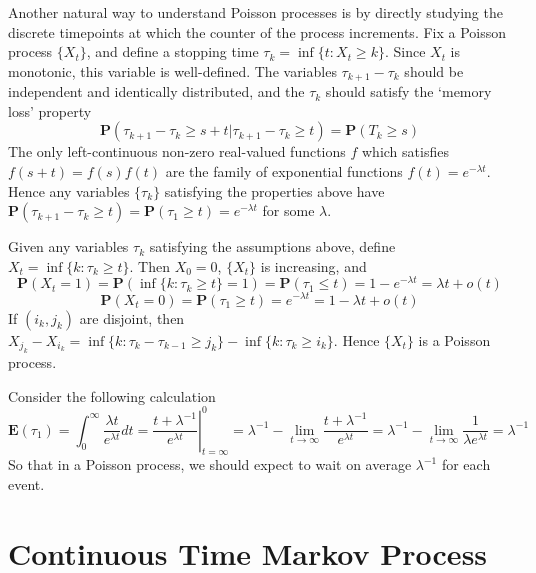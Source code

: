 Another natural way to understand Poisson processes is by directly studying the discrete timepoints at which the counter of the process increments. Fix a Poisson process $\{ X_t \}$, and define a stopping time $\tau_k = \inf \{ t: X_t \geq k \}$. Since $X_t$ is monotonic, this variable is well-defined. The variables $\tau_{k+1} - \tau_k$ should be independent and identically distributed, and the $\tau_k$ should satisfy the `memory loss' property
%
\[ \mathbf{P}(\tau_{k+1} - \tau_k \geq s + t | \tau_{k+1} - \tau_k \geq t) = \mathbf{P}(T_k \geq s) \]
%
The only left-continuous non-zero real-valued functions $f$ which satisfies $f(s + t) = f(s) f(t)$ are the family of exponential functions $f(t) = e^{-\lambda t}$. Hence any variables $\{ \tau_k \}$ satisfying the properties above have $\mathbf{P}(\tau_{k+1} - \tau_k \geq t) = \mathbf{P}(\tau_1 \geq t) = e^{-\lambda t}$ for some $\lambda$.

Given any variables $\tau_k$ satisfying the assumptions above, define $X_t = \inf \{ k: \tau_k \geq t \}$. Then $X_0 = 0$, $\{ X_t \}$ is increasing, and
%
\[ \mathbf{P}(X_t = 1) = \mathbf{P}(\inf \{ k : \tau_k \geq t \} = 1) = \mathbf{P}(\tau_1 \leq t) = 1 - e^{-\lambda t} = \lambda t + o(t) \]
%
\[ \mathbf{P}(X_t = 0) = \mathbf{P}(\tau_1 \geq t) = e^{-\lambda t} = 1 - \lambda t + o(t) \]
%
If $(i_k, j_k)$ are disjoint, then $X_{j_k} - X_{i_k} = \inf \{ k : \tau_k - \tau_{k-1} \geq j_k \} - \inf \{ k : \tau_k \geq i_k \}$. Hence $\{ X_t \}$ is a Poisson process.

Consider the following calculation
%
\[ \mathbf{E}(\tau_1) = \int_0^\infty \frac{\lambda t}{e^{\lambda t}} dt = \left.\frac{t + \lambda^{-1}}{e^{\lambda t}} \right|_{t = \infty}^0 = \lambda^{-1} - \lim_{t \to \infty} \frac{t + \lambda^{-1}}{e^{\lambda t}} = \lambda^{-1} - \lim_{t \to \infty} \frac{1}{\lambda e^{\lambda t}} = \lambda^{-1} \]
%
So that in a Poisson process, we should expect to wait on average $\lambda^{-1}$ for each event.

\section{Continuous Time Markov Process}

